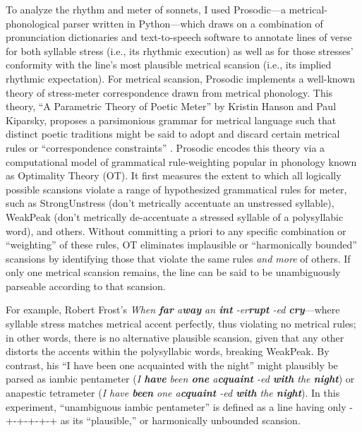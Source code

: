 \documentclass{simple-humanities}         %
\begin{document}
To analyze the rhythm and meter of sonnets, I used Prosodic---a metrical-phonological parser written in Python---which draws on a combination of pronunciation dictionaries and text-to-speech software to annotate lines of verse for both syllable stress (i.e., its rhythmic execution) as well as for those stresses' conformity with the line's most plausible metrical scansion (i.e., its implied rhythmic expectation).
For metrical scansion, Prosodic implements a well-known theory of stress-meter correspondence drawn from metrical phonology. This theory, ``A Parametric Theory of Poetic Meter'' by Kristin Hanson and Paul Kiparsky, proposes a parsimonious grammar for metrical language such that distinct poetic traditions might be said to adopt and discard certain metrical rules or ``correspondence constraints'' \parencite{hansonParametricTheoryPoetic1996}.
Prosodic encodes this theory via a computational model of grammatical rule-weighting popular in phonology known as Optimality Theory (OT).
It first measures the extent to which all logically possible scansions violate a range of hypothesized grammatical rules for meter, such as StrongUnstress (don't metrically accentuate an unstressed syllable), WeakPeak (don't metrically de-accentuate a stressed syllable of a polysyllabic word), and others.
Without committing a priori to any specific combination or ``weighting'' of these rules, OT eliminates implausible or ``harmonically bounded'' scansions by identifying those that violate the same rules \emph{and more} of others. If only one metrical scansion remains, the line can be said to be unambiguously parseable according to that scansion.

For example, Robert Frost's \emph{When \textbf{far} \textbar{} a\textbf{way} \textbar{} an \textbf{int} \textbar{} -er\textbf{rupt} \textbar{} -ed \textbf{cry}}---where syllable stress matches metrical accent perfectly, thus violating no metrical rules; in other words, there is no alternative plausible scansion, given that any other distorts the accents within the polysyllabic words, breaking WeakPeak.
By contrast, his ``I have been one acquainted with the night'' might plausibly be parsed as iambic pentameter (\emph{I \textbf{have} \textbar{} been \textbf{one} \textbar{} a\textbf{cquaint} \textbar{} -ed \textbf{with} \textbar{} the \textbf{night}}) or anapestic tetrameter (\emph{I have \textbf{been} \textbar{} one a\textbf{cquaint} \textbar{} -ed \textbf{with} \textbar{} the \textbf{night}}).
In this experiment, ``unambiguous iambic pentameter'' is defined as a line having only -+-+-+-+-+ as its ``plausible,'' or harmonically unbounded scansion.
\end{document}
